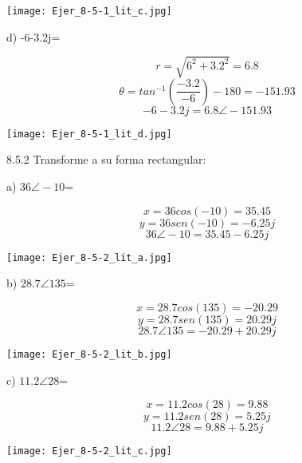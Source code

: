 \documentclass[a4paper, 11pt]{article}
\begin{document}
\texttt{[image: Ejer\_8-5-1\_lit\_c.jpg]}

d) -6-3.2j=

\begin{equation*}
r=\sqrt{6^{2}+3.2^{2}}=6.8
\end{equation*}
\begin{equation*}
\theta=tan^{-1}(\frac{-3.2}{-6})-180=-151.93
\end{equation*}
\begin{equation*}
-6-3.2j=6.8\angle-151.93
\end{equation*}

\texttt{[image: Ejer\_8-5-1\_lit\_d.jpg]}

8.5.2 Transforme a su forma rectangular:

a) $36\angle-10$=

\begin{equation*}
x=36cos(-10)=35.45
\end{equation*}
\begin{equation*}
y=36sen(-10)=-6.25j
\end{equation*}
\begin{equation*}
36\angle-10=35.45-6.25j
\end{equation*}

\texttt{[image: Ejer\_8-5-2\_lit\_a.jpg]}

b) $28.7\angle135$=

\begin{equation*}
x=28.7cos(135)=-20.29
\end{equation*}
\begin{equation*}
y=28.7sen(135)=20.29j
\end{equation*}
\begin{equation*}
28.7\angle135=-20.29+20.29j
\end{equation*}

\texttt{[image: Ejer\_8-5-2\_lit\_b.jpg]}

c) $11.2\angle28$=

\begin{equation*}
x=11.2cos(28)=9.88
\end{equation*}
\begin{equation*}
y=11.2sen(28)=5.25j
\end{equation*}
\begin{equation*}
11.2\angle28=9.88+5.25j
\end{equation*}

\texttt{[image: Ejer\_8-5-2\_lit\_c.jpg]}
\end{document}
